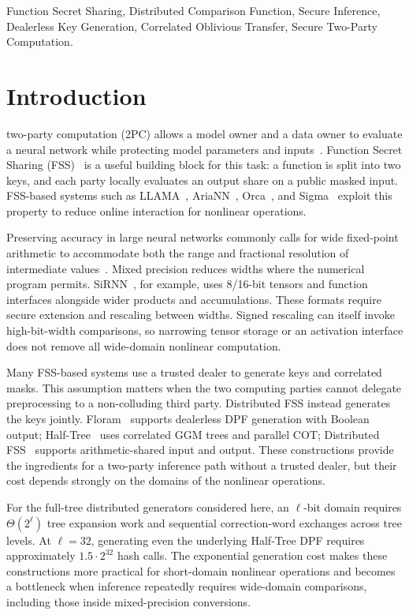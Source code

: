 \documentclass[journal]{IEEEtran}
\theoremstyle{definition}
\theoremstyle{plain}
\begin{document}
\begin{IEEEkeywords}
Function Secret Sharing, Distributed Comparison Function, Secure Inference,
Dealerless Key Generation, Correlated Oblivious Transfer, Secure Two-Party
Computation.
\end{IEEEkeywords}

\section{Introduction}\label{sec:intro}
 two-party computation (2PC) allows a model owner
and a data owner to evaluate a neural network while protecting model parameters
and inputs~\cite{secureml,cryptflow2}. Function Secret Sharing
(FSS)~\cite{bgi15,bgi16} is a useful building block for this task: a function
is split into two keys, and each party locally evaluates an output share on a
public masked input. FSS-based systems such as LLAMA~\cite{llama},
AriaNN~\cite{ariann}, Orca~\cite{orca}, and Sigma~\cite{sigma} exploit this
property to reduce online interaction for nonlinear operations.

Preserving accuracy in large neural networks commonly calls for wide fixed-point
arithmetic to accommodate both the range and fractional resolution of
intermediate values~\cite{cryptflow2,llama}. Mixed precision reduces widths where
the numerical program permits. SiRNN~\cite{sirnn}, for example, uses 8/16-bit
tensors and function interfaces alongside wider products and accumulations.
These formats require secure extension and rescaling between widths. Signed
rescaling can itself invoke high-bit-width comparisons, so narrowing tensor
storage or an activation interface does not remove all wide-domain nonlinear
computation.

Many FSS-based systems use a trusted dealer to generate keys and correlated masks.
This assumption matters when the two computing parties cannot delegate
preprocessing to a non-colluding third party. Distributed FSS instead generates
the keys jointly. Floram~\cite{floram} supports dealerless DPF generation with
Boolean output; Half-Tree~\cite{halftree} uses correlated GGM trees and parallel
COT; Distributed FSS~\cite{distfss} supports arithmetic-shared input and output.
These constructions provide the ingredients for a two-party inference path
without a trusted dealer, but their cost depends strongly on the domains of
the nonlinear operations.

For the full-tree distributed generators considered here, an $\ell$-bit domain
requires $\Theta(2^\ell)$ tree expansion work and sequential correction-word
exchanges across tree levels. At $\ell=32$, generating even the underlying
Half-Tree DPF requires approximately $1.5\cdot2^{32}$ hash calls. The
exponential generation cost makes these constructions more
practical for short-domain nonlinear operations and becomes a bottleneck when
inference repeatedly requires wide-domain comparisons, including those inside
mixed-precision conversions.
\end{document}
